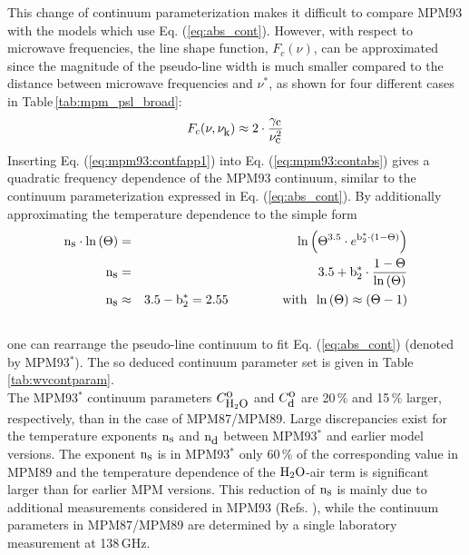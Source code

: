 {This change of continuum parameterization makes it difficult 
to compare MPM93 with the models which use Eq. (\ref{eq:abs_cont}). 
However, with respect to microwave frequencies, the 
line shape function, $F_c(\nu)$, can be approximated since 
the magnitude of the pseudo-line width is much smaller compared to the 
distance between microwave frequencies and $\nu^*$, as 
shown for four different cases in Table\,\ref{tab:mpm_psl_broad}:
\begin{equation}
 \label{eq:mpm93:contfapp1}
 F_{c}(\nu,\nu_{\mbox{\rm \small k}}) \approx 2 \cdot \frac{\gamma_{\mbox{\rm \small c}}}{\nu_{\mbox{\rm \small c}}^2}
\end{equation}
Inserting Eq. (\ref{eq:mpm93:contfapp1}) into Eq. (\ref{eq:mpm93:contabs})
gives a quadratic frequency dependence of the MPM93 continuum,
similar to the continuum parameterization expressed in 
Eq. (\ref{eq:abs_cont}). By additionally approximating 
the temperature dependence to the simple form
\begin{eqnarray}
  \xs\cdot\ln{(\Theta)} & = & 
  \ln{\left(\Theta^{3.5} \cdot e^{\bzks\cdot(1-\Theta)}\right)}\nonumber\\
%
  \xs  & = & 3.5 +
  \bzks\cdot\frac{1-\Theta}{\ln{(\Theta)}}\nonumber\\
%
  \xs & \approx & 3.5 -\bzks = 2.55\hspace*{15mm}\mbox{with}\hspace*{2mm}
                 \ln{(\Theta)}\approx(\Theta-1)\\
\nonumber
\end{eqnarray}
%
one can rearrange the pseudo-line continuum to fit Eq. (\ref{eq:abs_cont})
(denoted by MPM93$^*$). The so deduced continuum parameter set is given in 
Table \ref{tab:wvcontparam}.\\
The MPM93$^*$ continuum parameters $C^{\mbox{\rm o}}_{\mbox{\rm \small H}_{2}\mbox{\rm \small O}}$ and $C^{\mbox{\rm o}}_{\mbox{\rm \small d}}$ are 20\,\% and 
15\,\% larger, respectively, than in the case of MPM87/MPM89. 
Large discrepancies exist for the temperature exponents ${\rm n}_{\mbox{\rm \small s}}$ 
and ${\rm n}_{\mbox{\rm \small d}}$ between MPM93$^*$ and earlier model versions. The 
exponent ${\rm n}_{\mbox{\rm \small s}}$ is in MPM93$^*$ only 60\,\% of the corresponding 
value in MPM89 and the temperature dependence of the $\mbox{H}_2\mbox{O}$-air 
term is significant larger than for earlier MPM versions.
This reduction of ${\rm n}_{\mbox{\rm \small s}}$ is mainly due to additional measurements 
considered in MPM93 (Refs. \cite{beckerautler:46,godonetal:92}), 
while the continuum parameters in MPM87/MPM89 are determined 
by a single laboratory measurement at 138\,GHz.



}

